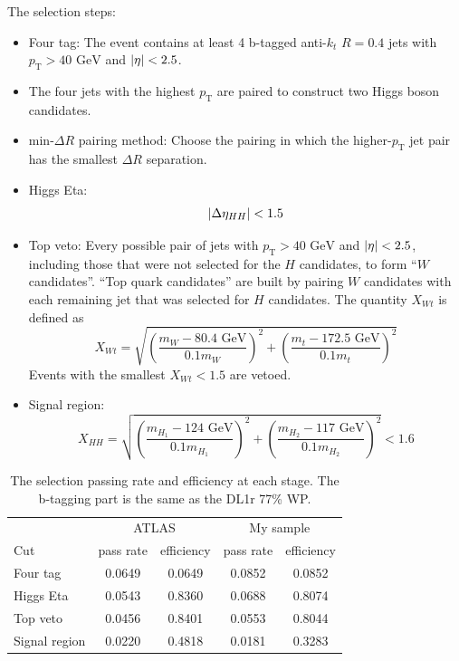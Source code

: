 \documentclass[12pt]{article}
\begin{document}
		The selection steps:
		\begin{itemize}
			\item Four tag: The event contains at least 4 b-tagged anti-$k_t$ $R = 0.4$ jets with $p_\text{T} > \text{40 GeV}$ and $\abs{\eta} < 2.5$.
			\item The four jets with the highest $p_\text{T}$ are paired to construct two Higgs boson candidates.
			\item $\text{min-}\Delta R$ pairing method: Choose the pairing in which the higher-$p_\text{T}$ jet pair has the smallest $\Delta R$ separation.
			\item Higgs Eta: 
			\[
				\abs{\Delta\eta_{HH}} < 1.5
			\] 
			\item Top veto: Every possible pair of jets with $p_\text{T} > \text{40 GeV}$ and $\abs{\eta} < 2.5$, including those that were not selected for the $H$ candidates, to form ``$W$ candidates''. ``Top quark candidates'' are built by pairing $W$ candidates with each remaining jet that was selected for $H$ candidates. The quantity $X_{Wt}$ is defined as
			\[
				X_{Wt} = \sqrt{\left( \frac{m_{W} - \text{80.4 GeV}}{0.1 m_{W}} \right)^2 + \left(\frac{m_{t} - \text{172.5 GeV}}{0.1 m_{t}} \right)^2} 
			\] 
			Events with the smallest $X_{Wt} < 1.5$ are vetoed.

			\item Signal region:
			\[
				X_{HH} = \sqrt{\left( \frac{m_{H_1}- \text{124 GeV}}{0.1 m_{H_1}} \right)^2 + \left(\frac{m_{H_2} - \text{117 GeV}}{0.1 m_{H_2}} \right)^2} < 1.6
			\]
			
		\end{itemize}
		\begin{table}[htpb]
			\centering
			\caption{The selection passing rate and efficiency at each stage. The b-tagging part is the same as the DL1r 77\% WP. }
			\label{tab:signal_selection_efficiency_DL1r}
			\begin{tabular}{l|cc|cc}
							  & \multicolumn{2}{|c|}{ATLAS} & \multicolumn{2}{|c}{My sample} \\
				Cut           & pass rate       & efficiency       & pass rate         & efficiency         \\ \hline
				Four tag      & 0.0649 & 0.0649 & 0.0852 & 0.0852 \\
				Higgs Eta     & 0.0543 & 0.8360 & 0.0688 & 0.8074 \\
				Top veto      & 0.0456 & 0.8401 & 0.0553 & 0.8044 \\
				Signal region & 0.0220 & 0.4818 & 0.0181 & 0.3283 \\
			\end{tabular}
		\end{table}
\end{document}
